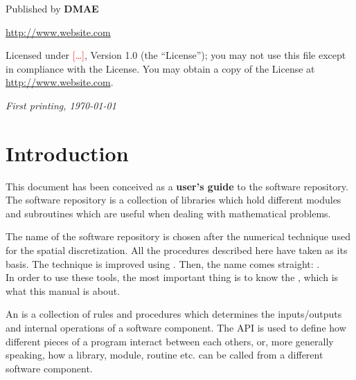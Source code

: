 \documentclass[11pt,twoside,a4paper]{book}
\begin{document}
\par {Published by \bf{DMAE}}

\par {\url{http://www.website.com}}

\par Licensed under {\textcolor{red}{[\ldots]}}, Version 1.0 (the ``License'');
you may not use this file except in compliance with the License. You may obtain a copy
of the License at \url{http://www.website.com}. 

\par\textit{First printing, \today}


 \newpage

%




\newpage

\tableofcontents

\newpage

\chapter*{Introduction}

This document has been conceived as a \textbf{user's guide} to the
 software repository.\\

The software repository is a collection of libraries which hold different
modules and subroutines which are useful when dealing with mathematical
problems.


The name of the software repository is chosen after the numerical technique used
for the spatial discretization. All the procedures described here have taken
 as its basis. The technique is improved using
. Then, the name comes straight: . \\

In order to use these tools, the most important thing is to know the ,
which is what this manual is about. 

An  is a
collection of rules and procedures which determines the inputs/outputs and internal
operations of a software component. The API is used to define how different
pieces of a program interact between each others, or, more generally speaking,
how a library, module, routine etc. can be called from a different software
component.\\
\end{document}
